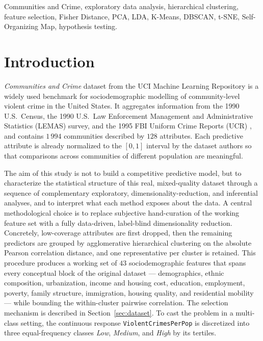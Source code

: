 \documentclass{ieeeaccess}
\begin{document}
\begin{keywords}
Communities and Crime, exploratory data analysis, hierarchical clustering, feature selection, Fisher Distance, PCA, LDA, K-Means, DBSCAN, t-SNE, Self-Organizing Map, hypothesis testing.
\end{keywords}

\titlepgskip=-21pt
\maketitle

\section{Introduction}
\label{sec:introduction}
 \emph{Communities and Crime} dataset from the UCI Machine Learning Repository \cite{uciccrime} is a widely used benchmark for sociodemographic modelling of community-level violent crime in the United States. It aggregates information from the 1990 U.S.~Census, the 1990 U.S.~Law Enforcement Management and Administrative Statistics (LEMAS) survey, and the 1995 FBI Uniform Crime Reports (UCR) \cite{redmondbaveja}, and contains $1\,994$ communities described by $128$ attributes. Each predictive attribute is already normalized to the $[0,1]$ interval by the dataset authors so that comparisons across communities of different population are meaningful.

The aim of this study is not to build a competitive predictive model, but to characterize the statistical structure of this real, mixed-quality dataset through a sequence of complementary exploratory, dimensionality-reduction, and inferential analyses, and to interpret what each method exposes about the data. A central methodological choice is to replace subjective hand-curation of the working feature set with a fully data-driven, label-blind dimensionality reduction. Concretely, low-coverage attributes are first dropped, then the remaining predictors are grouped by agglomerative hierarchical clustering on the absolute Pearson correlation distance, and one representative per cluster is retained. This procedure produces a working set of $43$ sociodemographic features that spans every conceptual block of the original dataset --- demographics, ethnic composition, urbanization, income and housing cost, education, employment, poverty, family structure, immigration, housing quality, and residential mobility --- while bounding the within-cluster pairwise correlation. The selection mechanism is described in Section~\ref{sec:dataset}. To cast the problem in a multi-class setting, the continuous response \texttt{ViolentCrimesPerPop} is discretized into three equal-frequency classes \emph{Low}, \emph{Medium}, and \emph{High} by its tertiles.
\end{document}
